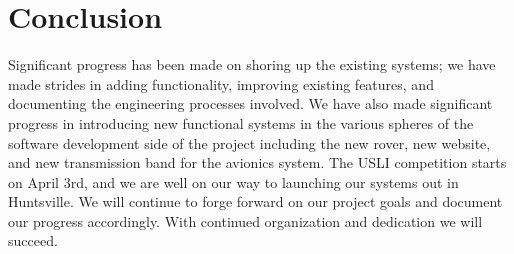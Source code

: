 \documentclass[journal,10pt,draftclsnofoot,onecolumn,compsoc]{IEEEtran} \usepackage[margin=0.75in]{geometry}
\begin{document}
\section{Conclusion}
Significant progress has been made on shoring up the existing systems; we have made strides in adding functionality, improving existing features, and documenting the engineering processes involved. We have also made significant progress in introducing new functional systems in the various spheres of the software development side of the project including the new rover, new website, and new transmission band for the avionics system. The USLI competition starts on April 3rd, and we are well on our way to launching our systems out in Huntsville. We will continue to forge forward on our project goals and document our progress accordingly. With continued organization and dedication we will succeed.
\end{document}
